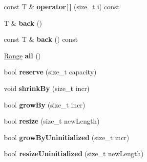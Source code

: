 \begin{DoxyCompactItemize}
\item 
\hypertarget{classjs_1_1_vector_acffb298a779d3f8e064816ade535510e}{const T \& {\bfseries operator\mbox{[}$\,$\mbox{]}} (size\-\_\-t i) const }\label{classjs_1_1_vector_acffb298a779d3f8e064816ade535510e}

\item 
\hypertarget{classjs_1_1_vector_afc533b99c9ab8e99d8c971094d931698}{T \& {\bfseries back} ()}\label{classjs_1_1_vector_afc533b99c9ab8e99d8c971094d931698}

\item 
\hypertarget{classjs_1_1_vector_a6b3d50495fc8ff0f6d705edcd9fd9d9a}{const T \& {\bfseries back} () const }\label{classjs_1_1_vector_a6b3d50495fc8ff0f6d705edcd9fd9d9a}

\item 
\hypertarget{classjs_1_1_vector_a82ccdcf96d6cb075116438fc51704a47}{\hyperlink{classjs_1_1_vector_1_1_range}{Range} {\bfseries all} ()}\label{classjs_1_1_vector_a82ccdcf96d6cb075116438fc51704a47}

\item 
\hypertarget{classjs_1_1_vector_a01cb4ce2ddb51c2d6cc9eadd5a071271}{bool {\bfseries reserve} (size\-\_\-t capacity)}\label{classjs_1_1_vector_a01cb4ce2ddb51c2d6cc9eadd5a071271}

\item 
\hypertarget{classjs_1_1_vector_a641397eeeae2dc12653ea6fb19d697fa}{void {\bfseries shrink\-By} (size\-\_\-t incr)}\label{classjs_1_1_vector_a641397eeeae2dc12653ea6fb19d697fa}

\item 
\hypertarget{classjs_1_1_vector_a06fae19ee630bf7917778eb025f6d350}{bool {\bfseries grow\-By} (size\-\_\-t incr)}\label{classjs_1_1_vector_a06fae19ee630bf7917778eb025f6d350}

\item 
\hypertarget{classjs_1_1_vector_a1a692bd843f50988a41c519a1ff71f2b}{bool {\bfseries resize} (size\-\_\-t new\-Length)}\label{classjs_1_1_vector_a1a692bd843f50988a41c519a1ff71f2b}

\item 
\hypertarget{classjs_1_1_vector_a499fdf78a6fb97c4add4eff8d196f2b7}{bool {\bfseries grow\-By\-Uninitialized} (size\-\_\-t incr)}\label{classjs_1_1_vector_a499fdf78a6fb97c4add4eff8d196f2b7}

\item 
\hypertarget{classjs_1_1_vector_a6b5b2c43a3c7df24f06f2e8d856e0161}{bool {\bfseries resize\-Uninitialized} (size\-\_\-t new\-Length)}\label{classjs_1_1_vector_a6b5b2c43a3c7df24f06f2e8d856e0161}


\end{DoxyCompactItemize}
